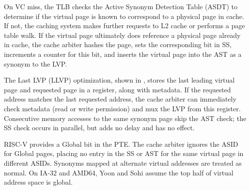 On VC miss, the TLB checks the Active Synonym Detection Table (ASDT) to determine if the virtual page is known to correspond to a physical page in cache.  If not, the caching system makes further requests to L2 cache or performs a page table walk.  If the virtual page ultimately does reference a physical page already in cache, the cache arbiter hashes the page, sets the corresponding bit in SS, increments a counter for this bit, and inserts the virtual page into the AST as a synonym to the LVP.

The Last LVP (LLVP) optimization, shown in , stores the last leading virtual page and requested page in a register, along with metadata.  If the requested address matches the last requested address, the cache arbiter can immediately check metadata (read or write permission) and mux the LVP from this register.  Consecutive memory accesses to the same synonym page skip the AST check; the SS check occurs in parallel, but adds no delay and has no effect.

RISC-V provides a Global bit in the PTE.  The cache arbiter ignores the ASID for Global pages, placing no entry in the SS or AST for the same virtual page in different ASIDs.  Synonyms mapped at alternate virtual addresses are treated as normal.  On IA-32 and AMD64, Yoon and Sohi assume the top half of virtual address space is global.